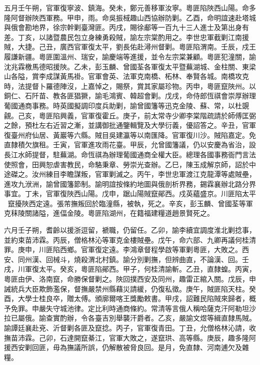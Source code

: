 \begin{pinyinscope}
五月壬午朔，官軍復寧波、鎮海。癸未，鄭元善移軍汝寧。粵匪陷陜西山陽。命多隆阿督辦陜西軍務。甲申，雨。命吳振棫趣山西協辦防剿。乙酉，命明誼速赴塔城與俄會勘地界，徐宗幹剿臺灣匪。丙戌，賜徐郙等一百九十三人進士及第出身有差。丁亥，以諸暨農民包立身練勇殺賊，諭左宗棠酌用之。李世忠軍截剿江南援賊，大捷。己丑，廣西官軍復太平，劉長佑赴潯州督剿。粵匪陷渭南。壬辰，戍王履謙新疆。粵匪圍溫州、瑞安，諭慶端等進援，並令左宗棠兼顧。粵匪犯潼關，諭沈兆霖檄馬德昭援陜。乙未，彭玉麟、曾國荃各軍復太平暨蕪湖城、金柱關、東梁山各隘，賞李成謀黃馬褂。官軍會英、法軍克南橋、柘林、奉賢各城。南橋攻克時，法提督卜羅德陣沒，上嘉悼之，賜祭，賞其家屬珍物。丙申，粵匪竄陜州。以銅仁、石阡苗、教各匪猖獗，諭毛鴻賓、韓超會剿。戊戌，命侍郎恆祺會崇厚辦理葡國通商事務。時英國擬調印度兵助剿，諭曾國籓等迅克金陵、蘇、常，以杜覬覦。己亥，粵匪陷興義，官軍復霍丘。庚子，前太常寺少卿李棠階疏請於師傅匡弼之餘，預杜左右近習之漸，並講御批通鑒輯覽及大學衍義，優詔答之。辛丑，官軍復臺州府仙居、黃巖等六縣。賊目吳建瀛等以南匯降。官軍復川沙。賊陷嘉定。免直隸積欠旗租。壬寅，官軍進攻雨花臺。甲辰，允曾國籓議，仍以安慶為省治，設長江水師提督，駐蕪湖。命恆祺為辦理葡國通商全權大臣。總理各國事務衙門言法使照會，田興恕虐害教民，命駱秉章、勞崇光查辦。乙巳，陳玉成解京師，詔於中途磔之。汝州練目李瞻謀叛，官軍剿滅之。丙午，李世忠軍渡江克龍潭等處賊壘，進攻九洑洲，諭曾國籓節制。諭明誼按條約地圖與俄剖析界務，錫霖襄辦北路分界事宜。丁未，官軍復陜西山陽。戊申，踞山陽賊竄鄖西。戍英蘊盛京。川匪陷太平，竄擾陜西定遠。張芾撫叛回於臨潼縣，被執，死之。辛亥，彭玉麟、曾國荃等軍克秣陵關諸隘，進偪金陵。粵匪陷湖州，在籍福建糧道趙景賢死之。

六月壬子朔，耆齡以援浙逗留，褫職，仍留任。乙卯，諭李續宜調度淮北剿捻事，並約束苗沛霖。丙辰，僧格林沁等軍克金樓賊壘。戊午，命六部、九卿再議何桂清罪。庚申，川匪陷西鄉。官軍復定遠。李鴻章督程學啟等軍剿粵匪，大敗之。西安、同州漢、回械斗，燒殺渭北村鎮。諭分別剿撫，但辨曲直，不論漢、回。壬戌，川軍復太平。癸亥，粵匪陷鄖西。甲子，何桂清諭斬。乙丑，直隸蝗。丙寅，粵匪由伊、洛南竄，命勝保督剿之。陜回撲西安及同州，趣雷正綰入關。戊辰，申誡統兵大臣欺飾濫保，督撫嚴禁州縣藉災請緩，仍復私徵。庚午，賊匪陷天柱。癸酉，大學士桂良卒，贈太傅。頒廓爾喀王獎勵敕書。甲戌，詔難民陷賊來歸者，概予免罪。申嚴失守城池律。定比利時通商條約。常清等言俄人稱哈薩克汗阿勒坦沙拉已屬俄。諭查實酌辦，令各臺吉別舉襲汗爵者。乙亥，嚴諭文煜等緝直隸馬賊。諭譚廷襄赴兗、沂督剿各匪及竄捻。丙子，官軍復青田。丁丑，允僧格林沁請，收撫苗沛霖。己卯，石達開竄綦江，官軍大敗之，遂竄珙、高等縣。庚辰，趣多隆阿援西安剿回匪，毋為撫議所誤，仍解散被脅良回。是月，免直隸、河南逋欠及雜糧。


\end{pinyinscope}
